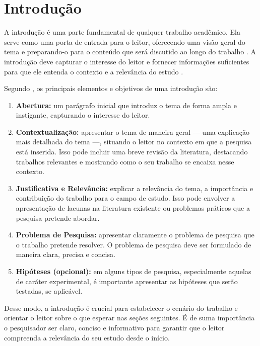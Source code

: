 \section{Introdução}\label{sec:intro}

A introdução é uma parte fundamental de qualquer trabalho acadêmico. Ela serve como uma porta de entrada para o leitor, oferecendo uma visão geral do tema e preparando-o para o conteúdo que será discutido ao longo do trabalho \cite{Marconi2021}. A introdução deve capturar o interesse do leitor e fornecer informações suficientes para que ele entenda o contexto e a relevância do estudo \cite{Wazlawick2021}.

Segundo , os principais elementos e objetivos de uma introdução são:
\begin{enumerate}[label=\alph*), itemsep=0pt, leftmargin=2.5cm]
    \item \textbf{Abertura:} um parágrafo inicial que introduz o tema de forma ampla e instigante, capturando o interesse do leitor.
    \item \textbf{Contextualização:} apresentar o tema de maneira geral --- uma explicação mais detalhada do tema ---, situando o leitor no contexto em que a pesquisa está inserida. Isso pode incluir uma breve revisão da literatura, destacando trabalhos relevantes e mostrando como o seu trabalho se encaixa nesse contexto.
    \item \textbf{Justificativa e Relevância:} explicar a relevância do tema, a importância e contribuição do trabalho para o campo de estudo. Isso pode envolver a apre\-sentação de lacunas na literatura existente ou problemas práticos que a pesquisa pretende abordar.
    \item \textbf{Problema de Pesquisa:} apresentar claramente o problema de pesquisa que o trabalho pretende resolver. O problema de pesquisa deve ser formulado de maneira clara, precisa e concisa.
    \item \textbf{Hipóteses (opcional):} em alguns tipos de pesquisa, especialmente aquelas de caráter experimental, é importante apresentar as hipóteses que serão testadas, se aplicável.
\end{enumerate}

Desse modo, a introdução é crucial para estabelecer o cenário do trabalho e orientar o leitor sobre o que esperar nas seções seguintes. É de suma importância o pesquisador ser claro, conciso e informativo para garantir que o leitor compreenda a relevância do seu estudo desde o início.